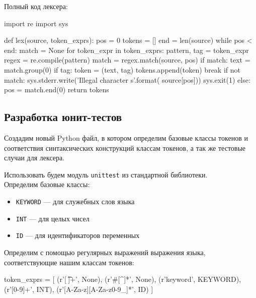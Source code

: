 \documentclass[a4paper,12pt]{article}
\begin{document}
Полный код лексера:
\begin{python}
import re
import sys


def lex(source, token_exprs):
    pos = 0
    tokens = []
    end = len(source)
    while pos < end:
        match = None
        for token_expr in token_exprs:
            pattern, tag = token_expr
            regex = re.compile(pattern)
            match = regex.match(source, pos)
            if match:
                text = match.group(0)
                if tag:
                    token = (text, tag)
                    tokens.append(token)
                break
        if not match:
            sys.stderr.write('Illegal character {s}'.format(
                                                 source[pos]))
            sys.exit(1)
        else:
            pos = match.end(0)
    return tokens
\end{python}
\vspace{12pt}

\newpage

\subsection{Разработка юнит-тестов}

\par Создадим новый Python файл, в котором определим базовые классы токенов и соответствия синтаксических конструкций классам токенов, а так же тестовые случаи для лексера. 
\par Использовать будем модуль \verb|unittest| из стандартной библиотеки.\\

Определим базовые классы:
\begin{itemize}
\item \verb|KEYWORD| --- для служебных слов языка
\item \verb|INT| --- для целых чисел
\item \verb|ID| --- для идентификаторов переменных\\
\end{itemize}

Определим с помощью регулярных выражений выражения языка, соответствующие нашим классам токенов:
\begin{python}
token_exprs = [
    (r'[ \t\n]+', None),
    (r'#[^\n]*', None),
    (r'keyword', KEYWORD),
    (r'[0-9]+', INT),
    (r'[A-Za-z][A-Za-z0-9_]*', ID)
]
\end{python}
\vspace{12pt}
\end{document}
